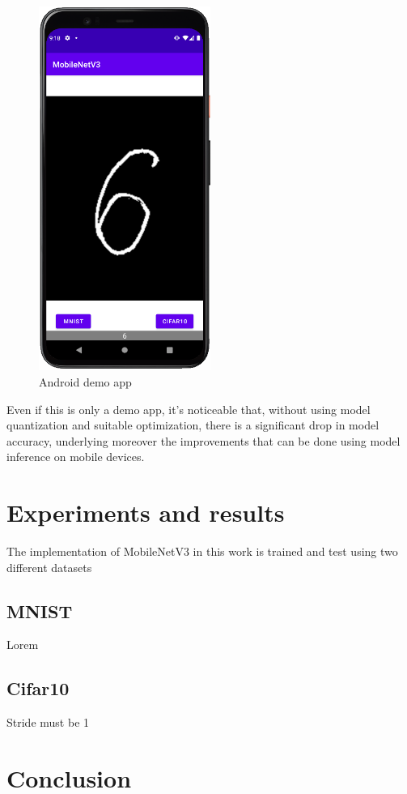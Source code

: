 \documentclass[12pt, letterpaper, twoside]{article}
\begin{document}
\begin{figure}[H]
	\centering
	\includegraphics[width=0.5\textwidth]{demo_app.png}
	\caption{Android demo app}
	\label{fig:demo_app}
\end{figure}

Even if this is only a demo app, it's noticeable that, without using model quantization and suitable optimization, there is a significant drop in model accuracy, underlying moreover the improvements that can be done using model inference on mobile devices.

\clearpage
\section{Experiments and results}
The implementation of MobileNetV3 in this work is trained and test using two different datasets

\subsection{MNIST}
Lorem
\subsection{Cifar10}
Stride must be 1

\clearpage


\clearpage
\section{Conclusion}


\clearpage

\nocite{*}
\printbibliography[heading=bibintoc,title={References}]
\end{document}
